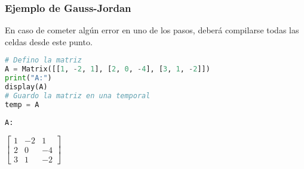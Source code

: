 \documentclass[a4,11pt]{aleph-notas}
\begin{document}
\subsubsection{Ejemplo de Gauss-Jordan}

En caso de cometer algún error en uno de los pasos, deberá compilarse todas las celdas desde este punto.

\begin{pycodigo}
    \begin{ipynbcodigo}\begin{lstlisting}[language=Python]
# Defino la matriz
A = Matrix([[1, -2, 1], [2, 0, -4], [3, 1, -2]])
print("A:")
display(A)
# Guardo la matriz en una temporal
temp = A
    \end{lstlisting}\end{ipynbcodigo}
    \begin{ipynbsalida}
    \begin{Verbatim}
A:
    \end{Verbatim}
    $\displaystyle \left[\begin{matrix}1 & -2 & 1\\2 & 0 & -4\\3 & 1 & -2\end{matrix}\right]$
    \end{ipynbsalida}
\end{pycodigo}
\end{document}
